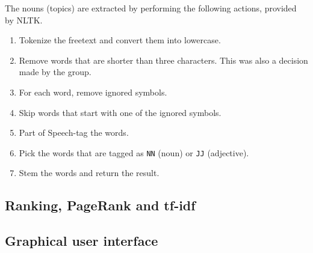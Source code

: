 The nouns (topics) are extracted by performing the following actions, provided
by NLTK.
\begin{enumerate}
    \item Tokenize the freetext and convert them into lowercase.
    \item Remove words that are shorter than three characters. This was also a
        decision made by the group.
    \item For each word, remove ignored symbols.
    \item Skip words that start with one of the ignored symbols.
    \item Part of Speech-tag \cite{pos} the words.
    \item Pick the words that are tagged as \texttt{NN} (noun) or \texttt{JJ}
        (adjective).
    \item Stem the words and return the result.
\end{enumerate}


\subsection{Ranking, PageRank and tf-idf}

\subsection{Graphical user interface}
